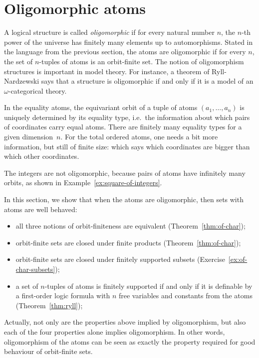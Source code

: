 \section{Oligomorphic atoms} 
 A logical structure is called \emph{oligomorphic} if for every natural number $n$, the $n$-th power of the universe has finitely many elements up to automorphisms. Stated in the language from the previous section, the atoms are oligomorphic if for every $n$, the set of $n$-tuples of atoms is an orbit-finite set. The notion of oligomorphism structures is important in model theory. For instance, a theorem of Ryll-Nardzewski says that a structure is oligomorphic if and only if it is a model of an $\omega$-categorical theory.
 
 \begin{ourexample} In the equality atoms, the equivariant orbit of a tuple of atoms $(a_1,\ldots,a_n)$ is uniquely determined by its equality type, i.e.~the information about which pairs of coordinates carry equal atoms. There are finitely many equality types for a given dimension~$n$. For the total ordered atoms, one needs a bit more information, but still of finite size: which says which coordinates are bigger than which other coordinates.
 \end{ourexample}

 \begin{ourexample}
 	The integers are not oligomorphic, because pairs of atoms have infinitely many orbits, as shown in Example~\ref{ex:square-of-integers}.
 \end{ourexample}
 
 
 
 In this section, we show that when the atoms are oligomorphic, then sets with atoms are well behaved:
 \begin{itemize}
 	\item all three notions of orbit-finiteness are equivalent (Theorem~\ref{thm:of-char});
	\item orbit-finite sets are closed under finite products (Theorem~\ref{thm:of-char});
		\item orbit-finite sets are closed under finitely supported subsets (Exercise~\ref{ex:of-char-subsets});
	\item a set of $n$-tuples of atoms is finitely supported if and only if it is definable by a first-order logic formula with $n$ free variables and constants from the atoms (Theorem~\ref{thm:ryll});	
 \end{itemize}
 Actually, not only are the properties above implied by oligomorphism, but also each of the four properties alone implies oligomorphism. In other words, oligomorphism of the atoms can be seen as exactly the property required for good behaviour of orbit-finite sets.
 
